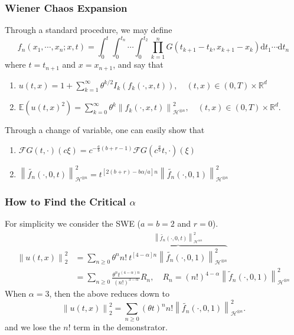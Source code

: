 \documentclass{beamer}%
\numberwithin{equation}{section}
\newcommand{\R}{\mathbb{R}}
\newcommand{\Norm}[1]{\left\|  #1   \right\|}
\newcommand{\ud}{\ensuremath{\mathrm{d} }}
\begin{document}
	\begin{frame}[t]
		\frametitle{Wiener Chaos Expansion}
		
		Through a standard procedure, we may define
		\[
		f_n(x_1, \cdots , x_n; x, t) = \int_0^t\int_0^{t_n}\cdots \int_0^{t_2} \prod_{k=1}^n G(t_{k+1}-t_k,x_{k+1}-x_k) \ud t_1 \cdots \ud t_n
		\]
		where $t=t_{n+1}$ and $x=x_{n+1}$, and say that
		\vspace{1em}
		\begin{enumerate}
			\setlength\itemsep{.8em}
			\item $u(t,x) = 1 + \sum_{k=1}^\infty \theta^{k/2} I_k(f_k(\cdot,x,t)), \quad (t,x)\in (0,T)\times \R^d$
			
			\item $\mathbb{E}(u(t,x)^2) = \sum_{k=0}^\infty \theta^{k} \Norm{f_k(\cdot,x,t)}^2_{\mathcal{H}^{\otimes n}}, \quad (t,x)\in (0,T)\times \R^d$.
		\end{enumerate}
		\vspace{1em}
		Through a change of variable, one can easily show that
		\vspace{1em}
		\begin{enumerate}
			\item $\mathcal{F}G(t,\cdot)(c\xi) = c^{-\frac{a}{b}(b+r -1)}\mathcal{F}G\left(c^{\frac{a}{b}}t,\cdot\right)( \xi)$
			\item $\Norm{\widetilde{f_n}(\cdot,0,t)}_{\mathcal{H}^{\otimes n}}^2 = t^{[2(b + r ) -b \alpha / a]n} \Norm{\widetilde{f_n}(\cdot,0,1)}_{\mathcal{H}^{\otimes n}}^2$
		\end{enumerate}
	\end{frame}
	
	\begin{frame}[t]
		\frametitle{How to Find the Critical $\alpha$}
		For simplicity we consider the SWE ($a=b=2$ and $r=0$).
		\begin{align*}
		\Norm{u(t,x)}_2^2 &= \sum_{n \ge 0} \theta^n n! \: \overbrace{t^{[4 - \alpha ]n}  \Norm{ \widetilde{f_n}(\cdot,0,1) }_{ \mathcal{H}^{\otimes n} }^2}^{\Norm{ \widetilde{f_n}(\cdot,0,t) }_{ \mathcal{H}^{\otimes n} }^2}
		\\&= \sum_{n \ge 0} \frac{\theta^nt^{(4-\alpha)n}}{(n!)^{3-\alpha}} R_n, \quad R_n = (n!)^{4-\alpha}\Norm{\widetilde{f}_n(\cdot,0,1)}_{\mathcal{H}^{\otimes n}}^2
		\end{align*}
		When $\alpha = 3$, then the above reduces down to
		\[
		\Norm{u(t,x)}_2^2 =  \sum_{n \ge 0} (\theta t)^n n! \Norm{ \widetilde{f_n}(\cdot,0,1) }_{ \mathcal{H}^{\otimes n} }^2.
		\]
		and we lose the $n!$ term in the demonstrator.
	\end{frame}
	
\end{document}
